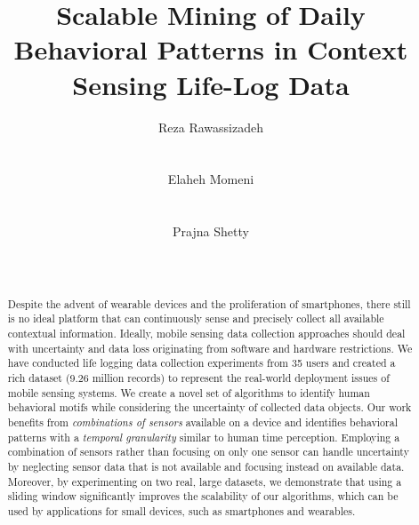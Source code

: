 \documentclass{sig-alternate}
\begin{document}
\title{Scalable Mining of Daily Behavioral Patterns in Context Sensing Life-Log Data} 

\author{
\alignauthor
Reza Rawassizadeh\\
       \\
       \\
\alignauthor
Elaheh Momeni\\
       \\
       \\
\alignauthor Prajna Shetty\\
	   \\
       \\
}
\maketitle
\begin{abstract}
Despite the advent of wearable devices and the proliferation of smartphones, there still is no ideal platform that can continuously sense and precisely collect all available contextual information. Ideally, mobile sensing data collection approaches should deal with uncertainty and data loss originating from software and hardware restrictions. We have conducted life logging data collection experiments from 35 users and created a rich dataset (9.26 million records) to represent the real-world deployment issues of mobile sensing systems. We create a novel set of algorithms to identify human behavioral motifs while considering the uncertainty of collected data objects. Our work benefits from \emph{combinations of sensors} available on a device and identifies behavioral patterns with a \emph{temporal granularity} similar to human time perception. Employing a combination of sensors rather than focusing on only one sensor can handle uncertainty by neglecting sensor data that is not available and focusing instead on available data. Moreover, by experimenting on two real, large datasets, we demonstrate that using a sliding window significantly improves the scalability of our algorithms, which can be used by applications for small devices, such as smartphones and wearables.
\end{abstract}
\vspace{-0.2cm}
\vspace{-0.2cm}
\end{document}

